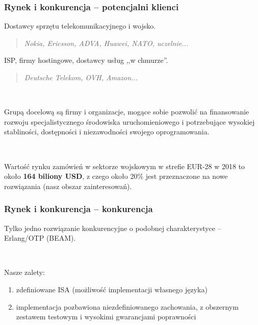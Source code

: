 \documentclass[aspectratio=169]{beamer}
\begin{document}
\begin{frame}
    \frametitle{Rynek i konkurencja -- potencjalni klienci}

    Dostawcy sprzętu telekomunikacyjnego i wojsko.

    \begin{quote}
        \begin{small}
            \emph{Nokia, Ericsson, ADVA, Huawei, NATO, uczelnie...}
        \end{small}
    \end{quote}

    ISP, firmy hostingowe, dostawcy usług ,,w chmurze''.

    \begin{quote}
        \begin{small}
            \emph{Deutsche Telekom, OVH, Amazon...}
        \end{small}
    \end{quote}

    ~

    Grupą docelową są firmy i organizacje, mogące sobie pozwolić na finansowanie
    rozwoju specjalistycznego środowiska uruchomieniowego i potrzebujące
    wysokiej stabliności, dostępności i niezawodności swojego oprogramowania.

    ~

    Wartość rynku zamówień w sektorze wojskowym w strefie EUR-28 w 2018 to około
    \textbf{164 biliony USD}, z czego około 20\% jest przeznaczone na nowe rozwiązania
    (nasz obszar zainteresowań).
\end{frame}

\begin{frame}
    \frametitle{Rynek i konkurencja -- konkurencja}

    Tylko jedno rozwiązanie konkurencyjne o podobnej charakterystyce --
    Erlang/OTP (BEAM).

    ~

    Nasze zalety:

    \begin{enumerate}
        \item zdefiniowane ISA (możliwość implementacji własnego języka)
        \item implementacja pozbawiona niezdefiniowanego zachowania, z obszernym
            zestawem testowym i wysokimi gwarancjami poprawności
    \end{enumerate}
\end{frame}
\end{document}
